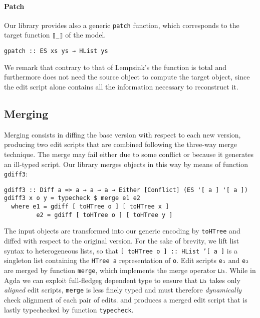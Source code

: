\documentclass{sigplanconf}
\theoremstyle{plain}
\begin{document}
\paragraph{Patch}
Our library provides also a generic \texttt{patch} function, which corresponds
to the target function \texttt{⟦\_⟧} of the model.
\begin{verbatim}
gpatch :: ES xs ys → HList ys
\end{verbatim}

We remark that contrary to that of Lempsink's \cite{Lemp09} the
function is total and furthermore does not need the source object to
compute the target object, since the edit script alone contains all
the information necessary to reconstruct it.

\subsection{Merging}
Merging consists in diffing the base version with respect to each new
version, producing two edit scripts that are combined following the
three-way merge technique.
%
The merge may fail either due to some conflict or because it generates
an ill-typed script.
%
Our library merges objects in this way by means of function \texttt{gdiff3}:
\begin{verbatim}
gdiff3 :: Diff a => a → a → a → Either [Conflict] (ES '[ a ] '[ a ])
gdiff3 x o y = typecheck $ merge e1 e2
  where e1 = gdiff [ toHTree o ] [ toHTree x ]
         e2 = gdiff [ toHTree o ] [ toHTree y ]
\end{verbatim}
The input objects are transformed into our generic encoding by
\texttt{toHTree} and diffed with respect to the original version.
%
For the sake of brevity, we lift list syntax to heterogeneous lists,
so that \texttt{[ toHTree o ] :: HList '[ a ]} is a singleton list
containing the \texttt{HTree a} representation of \texttt{o}.
%
Edit scripts \texttt{e₁} and \texttt{e₂} are merged by function
\texttt{merge}, which implements the merge operator \texttt{⊔₃}.
%
While in Agda we can exploit full-fledgeg dependent type to ensure
that \texttt{⊔₃} takes only \emph{aligned} edit scripts,
\texttt{merge} is less finely typed and must therefore
\emph{dynamically} check alignment of each pair of edits.
%
 and
produces a merged edit script that is lastly typechecked by function
\texttt{typecheck}.
%
\end{document}
